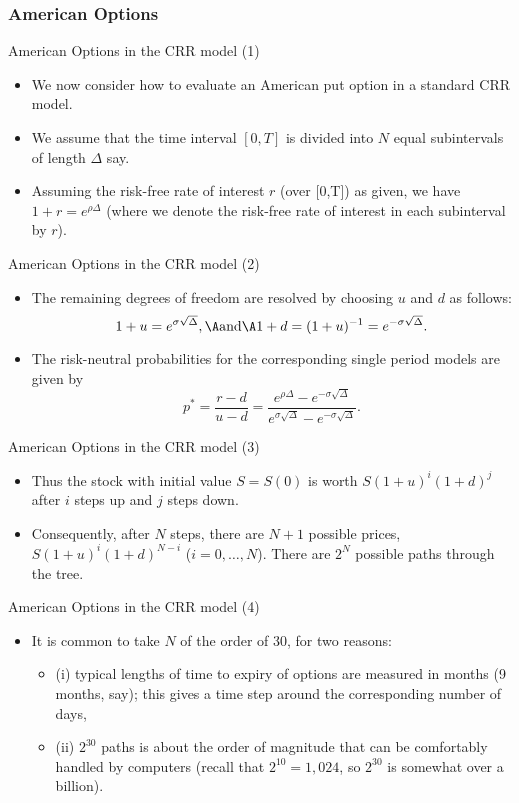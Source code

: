 \subsubsection{American Options}

{ American Options in the CRR model (1)}
\begin{itemize}
  \item We now consider how to evaluate an American put option in a
standard CRR model.
\item We assume that the time interval $[0,T]$ is
divided into $N$ equal subintervals of length $\Delta $ say.
\item Assuming the risk-free rate of interest $r$ (over [0,T]) as given,
we have $1+r = e^{\rho \Delta}$ (where we denote the risk-free
rate of interest in each subinterval by $r$).
\end{itemize}

{ American Options in the CRR model (2)}
\begin{itemize}
  \item The remaining
degrees of freedom are resolved by choosing $u$ and $d$ as
follows:
$$
1+u= e^{\sigma \sqrt{\Delta}}, \A \mbox{and} \A 1+d = (1+u)^{-1} =
e^{-\sigma \sqrt{\Delta}}.
$$
\item
The risk-neutral probabilities for
the corresponding single period models are given by
$$
p^*= \frac{r-d}{u-d} = \frac{e^{\rho \Delta}-e^{-\sigma
\sqrt{\Delta}}} {e^{\sigma \sqrt{\Delta}}-e^{-\sigma
\sqrt{\Delta}}}.
$$
\end{itemize}

{ American Options in the CRR model (3)}
\begin{itemize}
  \item Thus the stock with initial value $S = S(0)$ is worth $S (1+u)^i
(1+d)^j$ after $i$ steps up and $j$ steps down.
\item Consequently,
after $N$ steps, there are $N+1$ possible prices, $S (1+u)^i
(1+d)^{N-i}$ ($i = 0, \ldots, N$). There are $2^N$ possible paths
through the tree.
\end{itemize}

{ American Options in the CRR model (4)}
\begin{itemize}
  \item It is common to take $N$ of the order of 30, for
two reasons:
\begin{itemize}
  \item (i) typical lengths of time to expiry of
options are measured in months (9 months, say); this
gives a time step around the corresponding number of days,
\item (ii) $2^{30}$ paths is about the order of magnitude that can be
comfortably handled by computers (recall that $2^{10} = 1,024$, so
$2^{30}$ is somewhat over a billion).
\end{itemize}
\end{itemize}

